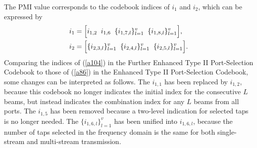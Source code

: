 \documentclass[lettersize,journal]{IEEEtran}
\begin{document}
The PMI value corresponds to the codebook indices of $i_1$ and $i_2$, which can be expressed by 
\begin{align}\label{a104}
&{i_1} = \Big[ {{i_{1,2}}\;\; i_{1,6}\;\;\{ {i_{1,7,l}}\} _{l = 1}^v\;\;\{ {i_{1,8,l}}\} _{l = 1}^v} \Big],\notag\\
&{i_2} = \Big[ \{{{i_{2,3,l}}\} _{l = 1}^v\;\;\{ {i_{2,4,l}}\} _{l = 1}^v\;\;\{ {i_{2,5,l}}\} _{l = 1}^v} \Big].
\end{align}
Comparing the indices of (\ref{a104}) in the Further Enhanced Type II Port-Selection Codebook to those of (\ref{a86}) in the Enhanced Type II Port-Selection Codebook, some changes can be interpreted as follows. The $i_{1,1}$ has been replaced by $i_{1,2}$, because this codebook no longer indicates the initial index for the consecutive $L$ beams, but instead indicates the combination index for any $L$ beams from all ports. The $i_{1,5}$ has been removed because a two-level indication for selected taps is no longer needed. The $\{ {i_{1,6,l}}\} _{l = 1}^v$ has been unified into ${i_{1,6,l}}$, because the number of taps selected in the frequency domain is the same for both single-stream and multi-stream transmission.
\end{document}
